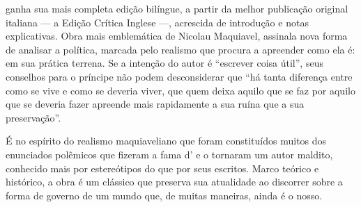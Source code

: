 \hspace*{-7cm}\hrulefill\hspace*{-7cm}

\medskip

 ganha sua mais completa edição bilíngue, a partir da melhor publicação original italiana --- a Edição Crítica Inglese ---, acrescida de introdução e notas explicativas. Obra mais emblemática de Nicolau Maquiavel, {} assinala nova forma de analisar a política, marcada pelo realismo que procura a apreender como ela é: em sua prática terrena. Se a intenção do autor é “escrever coisa útil”, seus conselhos para o príncipe não podem desconsiderar que “há tanta diferença entre como se vive e como se deveria viver, que quem deixa aquilo que se faz por aquilo que se deveria fazer apreende mais rapidamente a sua ruína que a sua preservação”.

É no espírito do realismo maquiaveliano que foram constituídos muitos dos enunciados polêmicos que fizeram a fama d'{} e o tornaram um autor maldito, conhecido mais por estereótipos do que por seus escritos. Marco teórico e histórico, a obra é um clássico que preserva sua atualidade ao discorrer sobre a forma de governo de um mundo que, de muitas maneiras, ainda é o nosso.


\vfill

\hspace*{-.4cm}\begin{minipage}[c]{.5\linewidth}
\small{
{}}
\end{minipage}



\pagebreak
\pagestyle{hedracat}

